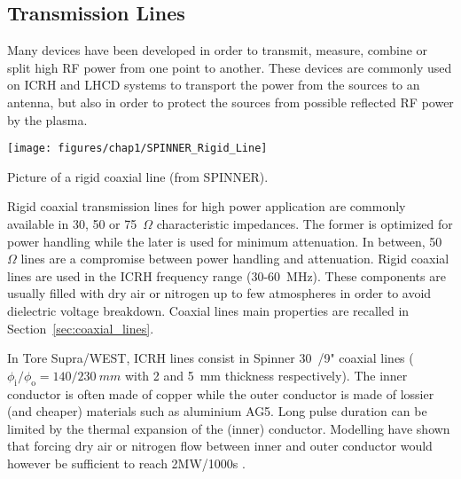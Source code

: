 \subsection{Transmission Lines}
Many devices have been developed in order to transmit, measure, combine or split high RF power from one point to another. These devices are commonly used on ICRH and LHCD systems to transport the power from the sources to an antenna, but also in order to protect the sources from possible reflected RF power by the plasma.  


\begin{marginfigure}
	\centering
	\texttt{[image: figures/chap1/SPINNER\_Rigid\_Line]}
	\caption{Picture of a rigid coaxial line (from SPINNER).}
	\label{fig:spinnerrigidline}
\end{marginfigure}

Rigid coaxial transmission lines for high power application are commonly available in 30, 50 or 75~$\si{\Omega}$ characteristic impedances. The former is optimized for power handling while the later is used for minimum attenuation. In between, 50~$\si{\Omega}$ lines are a compromise between power handling and attenuation. Rigid coaxial lines are used in the ICRH frequency range (30-60~\si{MHz}). These components are usually filled with dry air or nitrogen up to few atmospheres in order to avoid dielectric voltage breakdown. Coaxial lines main properties are recalled in Section~\ref{sec:coaxial_lines}.

In Tore Supra/WEST, ICRH lines consist in Spinner 30~\si{\Omega}/9" coaxial lines ($\phi_\mathrm{i}/\phi_\mathrm{o}=140/230~\si{mm}$ with 2 and 5~\si{mm} thickness respectively). The inner conductor is often made of copper while the outer conductor is made of lossier (and cheaper) materials such as aluminium AG5. Long pulse duration can be limited by the thermal expansion of the (inner) conductor. Modelling have shown that forcing dry air or nitrogen flow between inner and outer conductor would however be sufficient to reach 2\si{MW}/1000\si{s} .


